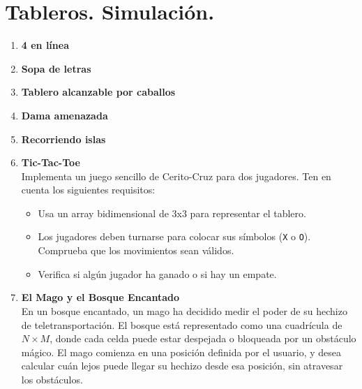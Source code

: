 \section{Tableros. Simulación.}
\begin{enumerate}
    \item \textbf{4 en línea}\\
    

    \item \textbf{Sopa de letras}\\
    

    \item \textbf{Tablero alcanzable por caballos}\\
    

    \item \textbf{Dama amenazada}\\
    

    \item \textbf{Recorriendo islas}\\
    

    \item \textbf{Tic-Tac-Toe}\\
    Implementa un juego sencillo de Cerito-Cruz para dos jugadores. Ten en cuenta los siguientes requisitos:
    \begin{itemize}
        \item Usa un array bidimensional de 3x3 para representar el tablero.
        \item Los jugadores deben turnarse para colocar sus símbolos (\texttt{X} o \texttt{O}). Comprueba que los movimientos sean válidos.
        \item Verifica si algún jugador ha ganado o si hay un empate.
    \end{itemize}

    \item \textbf{El Mago y el Bosque Encantado}\\
    En un bosque encantado, un mago ha decidido medir el poder de su hechizo de teletransportación. El bosque está representado como una cuadrícula de \(N \times M\), donde cada celda puede estar despejada o bloqueada por un obstáculo mágico. El mago comienza en una posición definida por el usuario, y desea calcular cuán lejos puede llegar su hechizo desde esa posición, sin atravesar los obstáculos.


\end{enumerate}
